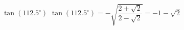 {$\tan(112.5^{\circ})$}
{$\tan(112.5^{\circ}) = - \sqrt{\dfrac{2+\sqrt{2}}{2-\sqrt{2}}} = -1 - \sqrt{2}$}
